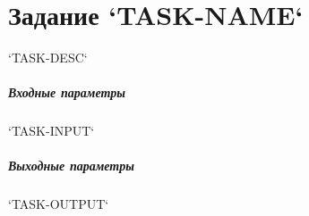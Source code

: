 \chapter{Задание `TASK-NAME`}

`TASK-DESC`

\paragraph{Входные параметры}

`TASK-INPUT`

\paragraph{Выходные параметры}

`TASK-OUTPUT`
